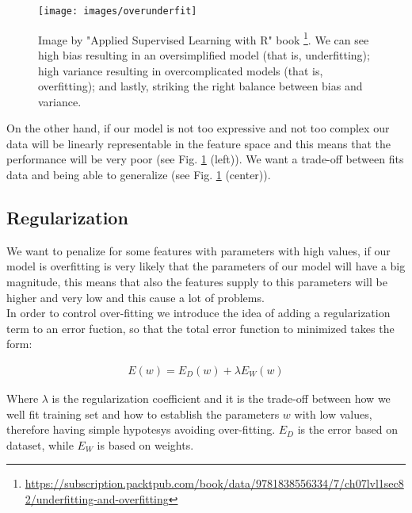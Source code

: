 \begin{figure}[H]
	\begin{minipage}{\textwidth}
		\centering
		\texttt{[image: images/overunderfit]}
		\caption[Overfitting and Underfitting.]{Image by "Applied Supervised Learning with R" book \footnote{\url{https://subscription.packtpub.com/book/data/9781838556334/7/ch07lvl1sec82/underfitting-and-overfitting}}. We can see high bias resulting in an oversimplified model (that is, underfitting); high variance resulting in overcomplicated models (that is, overfitting); and lastly, striking the right balance between bias and variance.}
		\label{fig:overunderfit}
	\end{minipage}
\end{figure}

\noindent On the other hand, if our model is not too expressive and not too complex our data will be linearly representable in the feature space and this means that the performance will be very poor (see Fig. \ref{fig:overunderfit} (left)). We want a trade-off between fits data and being able to generalize (see Fig. \ref{fig:overunderfit} (center)).

\subsection{Regularization}
We want to penalize for some features with parameters with high values, if our model is overfitting is very likely that the parameters of our model will have a big magnitude, this means that also the features supply to this parameters will be higher and very low and this cause a lot of problems. \\

\noindent In order to control over-fitting we introduce the idea of adding a regularization term to an error fuction, so that the total error function to minimized takes the form:

\begin{Equation}[H]
	\centering
	\begin{equation}\label{eq:fullreg}
		\begin{aligned}
			E(w) = E_D(w) + \lambda E_W(w)
		\end{aligned}
	\end{equation}
\end{Equation}

\noindent Where $\lambda$ is the regularization coefficient and it is the trade-off between how we well fit training set and how to establish the parameters $w$ with low values, therefore having simple hypotesys avoiding over-fitting. $E_D$ is the error based on dataset, while $E_W$ is based on weights.

